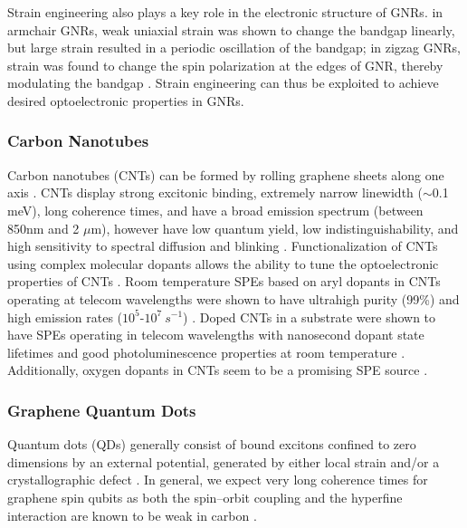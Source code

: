 \documentclass[]{article}
\begin{document}
Strain engineering also plays a key role in the electronic structure of GNRs. in armchair GNRs, weak uniaxial strain was shown to change the bandgap linearly, but large strain resulted in a periodic oscillation of the bandgap; in zigzag GNRs, strain was found to change the spin polarization at the edges of GNR, thereby modulating the bandgap \cite{bandgap_strained_GNR}. Strain engineering can thus be exploited to achieve desired optoelectronic properties in GNRs.


\subsubsection{Carbon Nanotubes}
Carbon nanotubes (CNTs) can be formed by rolling graphene sheets along one axis \cite{Properties_of_graphene:_a_theoretical_perspective}. CNTs display strong excitonic binding, extremely narrow linewidth ($\sim$0.1 meV), long coherence times, and have a broad emission spectrum (between 850nm and 2 $\mu$m), however have low quantum yield, low indistinguishability, and high sensitivity to spectral diffusion and blinking \cite{CNT_emerging_quantum_light_source}. Functionalization of CNTs using complex molecular dopants allows the ability to tune the optoelectronic properties of CNTs \cite{CNT_emerging_quantum_light_source, tunable_room_temp_SPE_CNTs}. Room temperature SPEs based on aryl dopants in CNTs operating at telecom wavelengths were shown to have ultrahigh purity (99\%) and high emission rates ($10^5$-$10^7 \ s^{-1}$) \cite{tunable_room_temp_SPE_CNTs}. Doped CNTs in a  substrate were shown to have SPEs operating in telecom wavelengths with nanosecond dopant state lifetimes and good photoluminescence properties at room temperature \cite{room_temp_dopants_CNT}. Additionally, oxygen dopants in CNTs seem to be a promising SPE source \cite{oxygen_dopants_cnts}.


\subsubsection{Graphene Quantum Dots}
Quantum dots (QDs) generally consist of bound excitons confined to zero dimensions by an external potential, generated by either local strain and/or a crystallographic defect \cite{SP_sources_atomically_thin_materials_review}. In general, we expect very long coherence times for graphene spin qubits as both the spin–orbit coupling and the hyperfine interaction are known to be weak in carbon \cite{spin_qubits_GQD, spin_coherence_GQD_thesis, QD_spin_qubits_graphene}.
\newline
\end{document}
